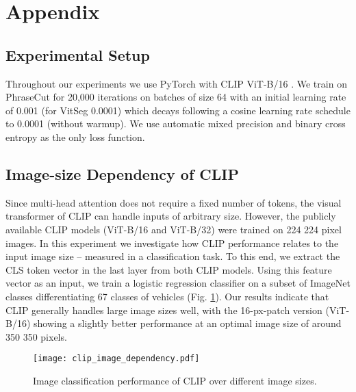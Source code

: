 \documentclass[10pt,twocolumn,letterpaper]{article}
\begin{document}
{
\small


}

\clearpage

\section*{Appendix}

\subsection*{Experimental Setup}

\label{sec:train_setup}

Throughout our experiments we use PyTorch \cite{pytorch} with CLIP ViT-B/16 \cite{radford20}. We train on PhraseCut \cite{wu20phrasecut} for 20,000 iterations on batches of size 64 with an initial learning rate of 0.001 (for VitSeg 0.0001) which decays following a cosine learning rate schedule to 0.0001 (without warmup). We use automatic mixed precision and binary cross entropy as the only loss function.


\subsection*{Image-size Dependency of CLIP}
Since multi-head attention does not require a fixed number of tokens, the visual transformer of CLIP can handle inputs of arbitrary size. However, the publicly available CLIP models (ViT-B/16 and ViT-B/32) were trained on 224  224 pixel images. In this experiment we investigate how CLIP performance relates to the input image size -- measured in a classification task.
To this end, we extract the CLS token vector in the last layer from both CLIP models. Using this feature vector as an input, we train a logistic regression classifier on a subset of ImageNet \cite{imagenet} classes differentiating 67 classes of vehicles (Fig. \ref{fig:image_size}).
Our results indicate that CLIP generally handles large image sizes well, with the 16-px-patch version (ViT-B/16) showing a slightly better performance at an optimal image size of around 350  350 pixels.

\begin{figure}[h]
    \centering
    \texttt{[image: clip\_image\_dependency.pdf]}
    \caption{Image classification performance of CLIP over different image sizes.}
    \label{fig:image_size}
\end{figure}
\end{document}
